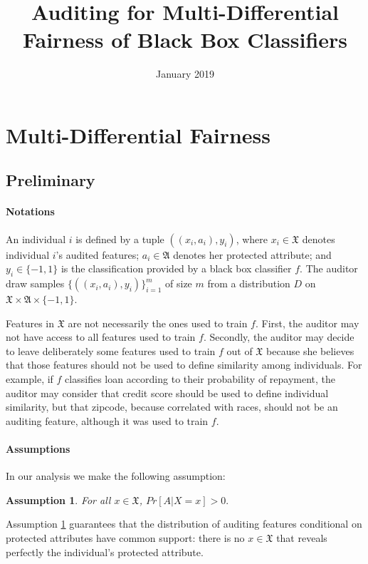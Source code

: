 \documentclass{article}
\title{Auditing for Multi-Differential Fairness of Black Box Classifiers}
\author{}
\date{January 2019}
\newtheorem{assumption}{Assumption}
\begin{document}
\maketitle

\section{Multi-Differential Fairness}

\subsection{Preliminary}

\paragraph{Notations}
An individual $i$ is defined by a tuple $((x_{i}, a_{i}), y_{i})$, where $x_{i}\in \mathfrak{X}$ denotes individual $i$'s audited features; $a_{i}\in\mathfrak{A}$ denotes her protected attribute; and $y_{i}\in \{-1, 1\}$ is the classification provided by a black box classifier $f$. The auditor draw samples $
\{((x_{i}, a_{i}), y_{i})\}_{i=1}^{m}$ of size $m$ from a distribution $D$ on $\mathfrak{X} \times \mathfrak{A}\times \{-1, 1\}$. 

\bigskip
Features in $\mathfrak{X}$ are not necessarily the ones used to train $f$. First, the auditor may not have access to all features used to train $f$. Secondly, the auditor may decide to leave deliberately some features used to train $f$ out of $\mathfrak{X}$ because she believes that those features should not be used to define similarity among individuals. For example, if $f$ classifies loan according to their probability of repayment, the auditor may consider that credit score should be used to define individual similarity, but that zipcode, because correlated with races, should not be an auditing feature, although it was used to train $f$.  

\paragraph{Assumptions}
In our analysis we make the following assumption:
\begin{assumption}
\label{ass: 1}
For all $x\in \mathfrak{X}$, $Pr[A|X=x] > 0.$
\end{assumption}
Assumption \ref{ass: 1} guarantees that the distribution of auditing features conditional on protected attributes have common support: there is no $x\in \mathfrak{X}$ that reveals perfectly the individual's protected attribute.  
\end{document}
